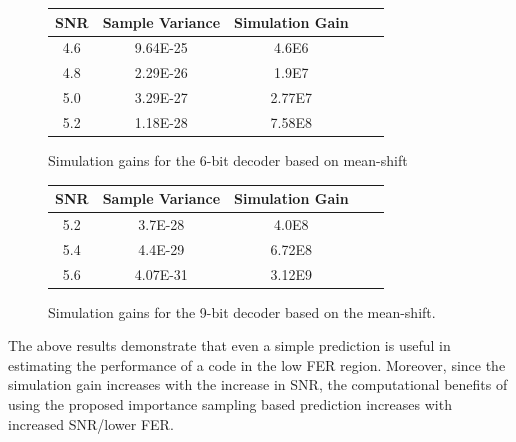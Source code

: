 \begin{figure}\center\begin{tabular}{|c|c|c|c|c|}
  \hline
  SNR & Sample Variance & Simulation Gain \\
  \hline
  4.6 &  9.64E-25 & 4.6E6 \\
  4.8 &  2.29E-26 & 1.9E7 \\
  5.0 &  3.29E-27 & 2.77E7 \\
  5.2 &  1.18E-28 & 7.58E8 \\
  \hline
\end{tabular}
\caption{Simulation gains for the 6-bit decoder based on
mean-shift}\label{table11}
\end{figure}

\begin{figure}\center\begin{tabular}{|c|c|c|c|c|}
  \hline
  SNR &  Sample Variance & Simulation Gain \\
  \hline
  5.2 & 3.7E-28 & 4.0E8 \\
  5.4 & 4.4E-29 & 6.72E8 \\
  5.6 & 4.07E-31 & 3.12E9 \\
  \hline
\end{tabular}
\caption{Simulation gains for the 9-bit decoder based on the
mean-shift.}\label{table12}
\end{figure}



 The above results demonstrate that even a
simple prediction is useful in estimating the performance of a
code in the low FER region. %
Moreover, since the
simulation gain increases with the increase in SNR, the
computational benefits of using the proposed importance sampling
based prediction increases with increased SNR/lower FER.


